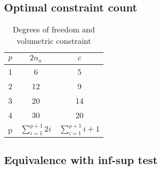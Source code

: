 \subsection{Optimal constraint count}
\begin{table}[ht!]
\centering
\caption{Degrees of freedom and volumetric constraint}
\begin{tabular}{ccc}
\toprule
$p$ & $2n_u$ & $c$ \\
\midrule
1 & 6 & 5 \\
2 & 12 & 9 \\
3 & 20 & 14 \\
4 & 30 & 20 \\
p & $\sum_{i=1}^{p+1}2i$ & $\sum_{i=1}^{p+1}i+1$ \\
\bottomrule
\end{tabular}

\subsection{Equivalence with inf-sup test}
\end{table}
